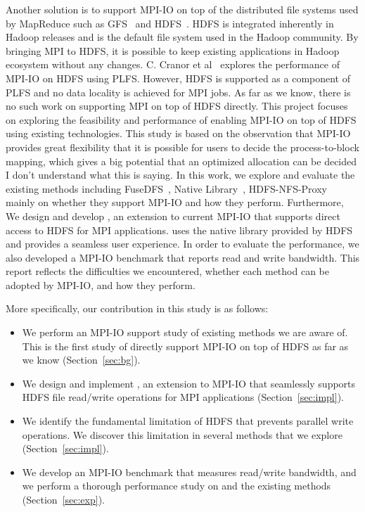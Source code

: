 Another solution is to support MPI-IO on top of the distributed file systems
used by MapReduce such as GFS~\cite{gfs} and HDFS~\cite{hdfs}. HDFS is integrated
inherently in Hadoop releases and is the default file system used in the Hadoop
community. By bringing MPI to HDFS, it is possible to keep existing applications
in Hadoop ecosystem without any changes. C. Cranor et al~\cite{CMU-PDL-12-115} explores the
performance of MPI-IO on HDFS using PLFS. However, HDFS is supported as a
component of PLFS and no data locality is achieved for MPI jobs. As far as we
know, there is no such work on supporting MPI on top of HDFS directly. This
project focuses on exploring the feasibility and performance of enabling MPI-IO
on top of HDFS using existing technologies. This study is based on the
observation that MPI-IO provides great flexibility that it is possible for users
to decide the process-to-block mapping, which gives a big potential that an
optimized allocation can be decided {\color{red} I don't understand what this is saying}. In this work, we explore and evaluate
the existing methods including FuseDFS~\cite{fuse}, Native Library~\cite{lib},
HDFS-NFS-Proxy~\cite{proxy} mainly on whether they support MPI-IO and how
they perform. Furthermore, We design and develop
{\proj}, an extension to current MPI-IO that supports direct access to HDFS for
MPI applications. {\proj} uses the native library provided by HDFS and provides a
seamless user experience. In order to evaluate the performance, we also
developed a MPI-IO benchmark that reports read and write bandwidth. This report
reflects the difficulties we encountered, whether each method can be adopted by
MPI-IO, and how they perform. 

More specifically, our contribution in this study is as follows:
\begin{itemize}
\item We perform an MPI-IO support study of existing methods we are aware of. This
	is the first study of directly support MPI-IO on top of HDFS as far as
	we know (Section~\ref{sec:bg}).
\item We design and implement {\proj}, an extension to MPI-IO that seamlessly
	supports HDFS file read/write operations for MPI applications 
	(Section~\ref{sec:impl}).
\item We identify the fundamental limitation of HDFS that prevents parallel
	write operations. We discover this limitation in several methods that we
	explore (Section~\ref{sec:impl}).
\item We develop an MPI-IO benchmark that measures read/write bandwidth, and
	we perform a thorough performance study on {\proj} and the existing
	methods (Section~\ref{sec:exp}).
\end{itemize}

